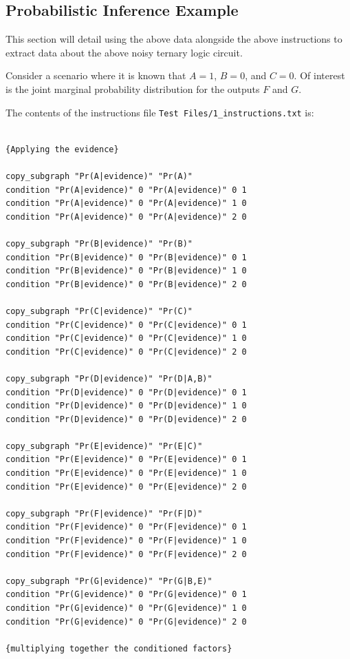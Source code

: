 \documentclass{article}
\begin{document}
\subsection{Probabilistic Inference Example}

This section will detail using the above data alongside the above instructions to extract data about the above noisy ternary logic circuit. 

Consider a scenario where it is known that \(A = 1\), \(B=0\), and \(C=0\). Of interest is the joint marginal probability distribution for the outputs \(F\) and \(G\).   

The contents of the instructions file \texttt{Test Files/1\_instructions.txt} is:

\begin{verbatim}

{Applying the evidence}

copy_subgraph "Pr(A|evidence)" "Pr(A)"
condition "Pr(A|evidence)" 0 "Pr(A|evidence)" 0 1
condition "Pr(A|evidence)" 0 "Pr(A|evidence)" 1 0 
condition "Pr(A|evidence)" 0 "Pr(A|evidence)" 2 0 

copy_subgraph "Pr(B|evidence)" "Pr(B)"
condition "Pr(B|evidence)" 0 "Pr(B|evidence)" 0 1
condition "Pr(B|evidence)" 0 "Pr(B|evidence)" 1 0 
condition "Pr(B|evidence)" 0 "Pr(B|evidence)" 2 0 

copy_subgraph "Pr(C|evidence)" "Pr(C)"
condition "Pr(C|evidence)" 0 "Pr(C|evidence)" 0 1
condition "Pr(C|evidence)" 0 "Pr(C|evidence)" 1 0 
condition "Pr(C|evidence)" 0 "Pr(C|evidence)" 2 0 

copy_subgraph "Pr(D|evidence)" "Pr(D|A,B)"
condition "Pr(D|evidence)" 0 "Pr(D|evidence)" 0 1
condition "Pr(D|evidence)" 0 "Pr(D|evidence)" 1 0 
condition "Pr(D|evidence)" 0 "Pr(D|evidence)" 2 0

copy_subgraph "Pr(E|evidence)" "Pr(E|C)"
condition "Pr(E|evidence)" 0 "Pr(E|evidence)" 0 1
condition "Pr(E|evidence)" 0 "Pr(E|evidence)" 1 0 
condition "Pr(E|evidence)" 0 "Pr(E|evidence)" 2 0  

copy_subgraph "Pr(F|evidence)" "Pr(F|D)"
condition "Pr(F|evidence)" 0 "Pr(F|evidence)" 0 1
condition "Pr(F|evidence)" 0 "Pr(F|evidence)" 1 0 
condition "Pr(F|evidence)" 0 "Pr(F|evidence)" 2 0 

copy_subgraph "Pr(G|evidence)" "Pr(G|B,E)"
condition "Pr(G|evidence)" 0 "Pr(G|evidence)" 0 1
condition "Pr(G|evidence)" 0 "Pr(G|evidence)" 1 0 
condition "Pr(G|evidence)" 0 "Pr(G|evidence)" 2 0 

{multiplying together the conditioned factors}


\end{verbatim}
\end{document}
